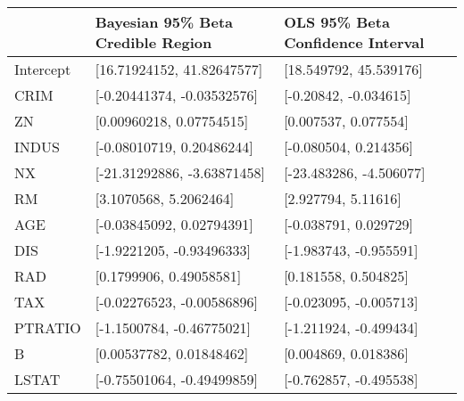 \begin{tabular}{lll}
\hline
           & Bayesian 95\% Beta Credible Region   & OLS 95\% Beta Confidence Interval   \\
\hline
 Intercept & [16.71924152, 41.82647577]          & [18.549792, 45.539176]             \\
 CRIM      & [-0.20441374, -0.03532576]          & [-0.20842, -0.034615]              \\
 ZN        & [0.00960218, 0.07754515]            & [0.007537, 0.077554]               \\
 INDUS     & [-0.08010719, 0.20486244]           & [-0.080504, 0.214356]              \\
 NX        & [-21.31292886, -3.63871458]         & [-23.483286, -4.506077]            \\
 RM        & [3.1070568, 5.2062464]              & [2.927794, 5.11616]                \\
 AGE       & [-0.03845092, 0.02794391]           & [-0.038791, 0.029729]              \\
 DIS       & [-1.9221205, -0.93496333]           & [-1.983743, -0.955591]             \\
 RAD       & [0.1799906, 0.49058581]             & [0.181558, 0.504825]               \\
 TAX       & [-0.02276523, -0.00586896]          & [-0.023095, -0.005713]             \\
 PTRATIO   & [-1.1500784, -0.46775021]           & [-1.211924, -0.499434]             \\
 B         & [0.00537782, 0.01848462]            & [0.004869, 0.018386]               \\
 LSTAT     & [-0.75501064, -0.49499859]          & [-0.762857, -0.495538]             \\
\hline
\end{tabular}